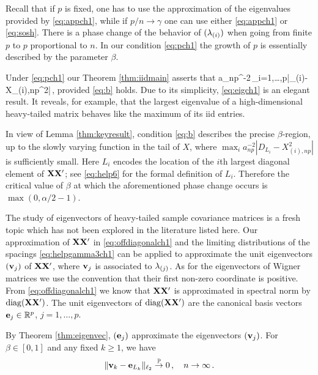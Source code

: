 Recall that if $p$ is fixed, one has to use the approximation of the eigenvalues provided by \eqref{eq:appch1}, while if $p/n \to \gamma$ one can use either \eqref{eq:appch1} or \eqref{eq:sosh}. There is a phase change of the behavior of $(\lambda_{(i)})$ when going from finite $p$ to $p$ proportional to $n$. In our condition \eqref{eq:pch1} the growth of $p$ is essentially described by the parameter $\beta$. 

Under \eqref{eq:pch1} our Theorem \ref{thm:iidmain} asserts that 
\beam\label{eq:eigch1}
a_{np}^{-2}\,\max_{i=1,\ldots,p}\big|\la_{(i)}-X_{(i),np}^2\big|\,,
\eeam
provided \eqref{eq:b} holds. Due to its simplicity, \eqref{eq:eigch1} is an elegant result. It reveals, for example, that the largest eigenvalue of a high-dimensional heavy-tailed matrix behaves like the maximum of its iid entries. 

In view of Lemma \ref{thm:keyresult}, condition \eqref{eq:b} describes the precise $\beta$-region, up to the slowly varying function in the tail of $X$, where $\max_i a_{np}^{-2}|D_{L_i}-X_{(i),np}^2|$ is sufficiently small. 
Here $L_i$ encodes the location of the $i$th largest diagonal element of ${\mathbf X}{\mathbf X}'$; see \eqref{eq:help6} for the formal definition of $L_i$.
Therefore the critical value of $\beta$ at which the aforementioned phase change occurs is  $\max(0,\alpha/2-1)$.
\medskip

The study of eigenvectors of heavy-tailed sample covariance matrices is a fresh topic which has not been explored in the literature listed here.
Our approximation of ${\mathbf X}{\mathbf X}'$ in \eqref{eq:offdiagonalch1} and the limiting distributions of the spacings \eqref{eq:helpgamma3ch1} can be applied to approximate the unit eigenvectors $({\mathbf v}_j)$ of ${\mathbf X}{\mathbf X}'$, where ${\mathbf v}_{{j}}$ is associated to $\lambda_{(j)}$. As for the eigenvectors of Wigner matrices we use the convention that their first non-zero coordinate is positive.
From \eqref{eq:offdiagonalch1} we know that ${\mathbf X}{\mathbf X}'$ is approximated in spectral norm by $\operatorname{diag}({\mathbf X}{\mathbf X}')$. The unit eigenvectors of $\operatorname{diag}({\mathbf X}{\mathbf X}')$ are the canonical basis vectors ${\mathbf e}_j\in\mathbb{R}^p$, $j=1,\dots,p$. 
 
By Theorem \ref{thm:eigenvec}, $({\mathbf e}_j)$ approximate the eigenvectors $({\mathbf v}_j)$.
For $\beta\in [0,1]$ and any fixed $k\ge 1$, we have
\begin{equation}\label{eq:eigenvec}
\|{\mathbf v}_k - {\mathbf e}_{L_k}\|_{\ell_2} \stackrel{\mathbb{P}}{\rightarrow} 0\,, \quad n \to \infty \,.
\end{equation}







